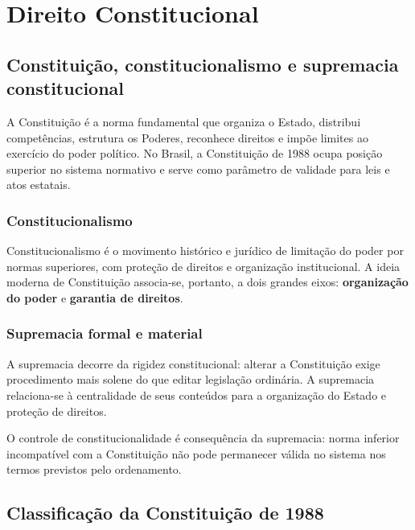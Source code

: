 \chapter{Direito Constitucional}

\section{Constituição, constitucionalismo e supremacia constitucional}

A Constituição é a norma fundamental que organiza o Estado, distribui competências, estrutura os Poderes, reconhece direitos e impõe limites ao exercício do poder político. No Brasil, a Constituição de 1988 ocupa posição superior no sistema normativo e serve como parâmetro de validade para leis e atos estatais.

\subsection{Constitucionalismo}

Constitucionalismo é o movimento histórico e jurídico de limitação do poder por normas superiores, com proteção de direitos e organização institucional. A ideia moderna de Constituição associa-se, portanto, a dois grandes eixos: \textbf{organização do poder} e \textbf{garantia de direitos}.

\subsection{Supremacia formal e material}

A supremacia  decorre da rigidez constitucional: alterar a Constituição exige procedimento mais solene do que editar legislação ordinária. A supremacia  relaciona-se à centralidade de seus conteúdos para a organização do Estado e proteção de direitos.

O controle de constitucionalidade é consequência da supremacia: norma inferior incompatível com a Constituição não pode permanecer válida no sistema nos termos previstos pelo ordenamento.

\section{Classificação da Constituição de 1988}

